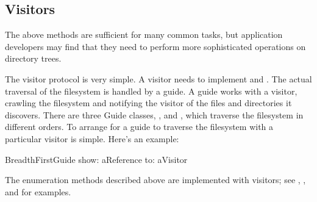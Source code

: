 \documentclass[a4paper,10pt,twoside]{book}
\begin{document}
 


\subsection{Visitors}

The above methods are sufficient for many common tasks, but application developers may find that they need to perform more sophisticated operations on directory trees.

The visitor protocol is very simple. A visitor needs to implement  and . The actual traversal of the filesystem is handled by a guide. A guide works with a visitor, crawling the filesystem and notifying the visitor of the files and directories it discovers. There are three Guide classes, ,  and  , which traverse the filesystem in different orders. To arrange for a guide to traverse the filesystem with a particular visitor is simple. Here's an example:

\begin{code}{}
    BreadthFirstGuide show: aReference to: aVisitor
\end{code}	

The enumeration methods described above are implemented with visitors; see , , and  for examples.


\ifx\wholebook\relax\else
   
   
\end{document}
